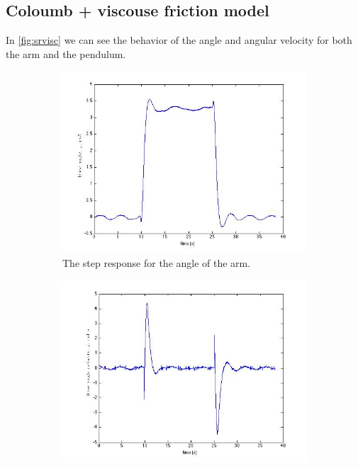 \documentclass[10pt,a4paper]{article}
\begin{document}
\subsection{Coloumb + viscouse friction model}
In \ref{fig:srvisc} we can see the behavior of the angle and angular velocity for both the arm and the pendulum.
\begin{figure}[H]
\centering
		\begin{subfigure}[t]{0.49\textwidth}
			\includegraphics[scale=0.33]{plots/steprespviscphi.jpg}
			\centering
			\caption{The step response for the angle of the arm.}
			\label{subfigure:srviscphi}
		\end{subfigure}
		\begin{subfigure}[t]{0.49\textwidth}
			\includegraphics[scale=0.33]{plots/steprespviscphidot.jpg}

\end{subfigure}
\end{figure}
\end{document}
